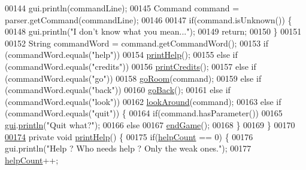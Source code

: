 \begin{DoxyCode}
00144         gui.println(commandLine);
00145         Command command = parser.getCommand(commandLine);
00146 
00147         \textcolor{keywordflow}{if}(command.isUnknown()) \{
00148             gui.println(\textcolor{stringliteral}{"I don't know what you mean..."});
00149             \textcolor{keywordflow}{return};
00150         \}
00151 
00152         String commandWord = command.getCommandWord();
00153         \textcolor{keywordflow}{if} (commandWord.equals(\textcolor{stringliteral}{"help"}))
00154             \hyperlink{classGameEngine_a8959e384cc77e69ab0ce9da8ba5057cd}{printHelp}();
00155         \textcolor{keywordflow}{else} \textcolor{keywordflow}{if} (commandWord.equals(\textcolor{stringliteral}{"credits"}))
00156             \hyperlink{classGameEngine_a0cc83a912708431a667e73c9a8aa3698}{printCredits}();
00157         \textcolor{keywordflow}{else} \textcolor{keywordflow}{if} (commandWord.equals(\textcolor{stringliteral}{"go"}))
00158             \hyperlink{classGameEngine_a2ec577574f345764435837fc0204b2e0}{goRoom}(command);
00159         \textcolor{keywordflow}{else} \textcolor{keywordflow}{if} (commandWord.equals(\textcolor{stringliteral}{"back"}))
00160             \hyperlink{classGameEngine_ac22dcdb540cb27f39597ee4f03ad167a}{goBack}();
00161         \textcolor{keywordflow}{else} \textcolor{keywordflow}{if} (commandWord.equals(\textcolor{stringliteral}{"look"}))
00162             \hyperlink{classGameEngine_ab620e2e6c8627aba28cc2c33fefe50e3}{lookAround}(command);
00163         \textcolor{keywordflow}{else} \textcolor{keywordflow}{if} (commandWord.equals(\textcolor{stringliteral}{"quit"})) \{
00164             \textcolor{keywordflow}{if}(command.hasParameter())
00165                 \hyperlink{classGameEngine_a2a7d0bb6183b3f3ef3ee2008926374a0}{gui}.\hyperlink{classUserInterface_a79f606b4b1f5d1523e50eea00039ed94}{println}(\textcolor{stringliteral}{"Quit what?"});
00166             \textcolor{keywordflow}{else}
00167                 \hyperlink{classGameEngine_abebbf1bda82aa3ca162f7187a64e41ed}{endGame}();
00168         \}
00169     \}
00170 
\hypertarget{GameEngine_8java_source_l00174}{}\hyperlink{classGameEngine_a8959e384cc77e69ab0ce9da8ba5057cd}{00174}     \textcolor{keyword}{private} \textcolor{keywordtype}{void} \hyperlink{classGameEngine_a8959e384cc77e69ab0ce9da8ba5057cd}{printHelp}() \{
00175         \textcolor{keywordflow}{if}(\hyperlink{classGameEngine_a308a9926d553d53cb4c56c28588f6c62}{helpCount} == 0) \{
00176             gui.println(\textcolor{stringliteral}{"Help ? Who needs help ? Only the weak ones."});
00177             \hyperlink{classGameEngine_a308a9926d553d53cb4c56c28588f6c62}{helpCount}++;

\end{DoxyCode}
